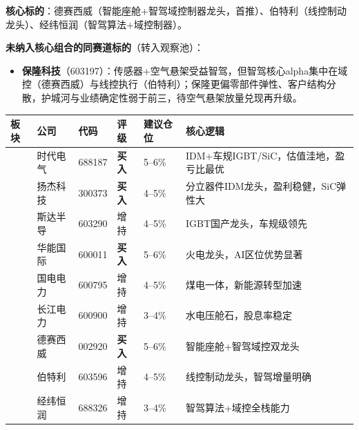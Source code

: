 \textbf{核心标的}：德赛西威（智能座舱+智驾域控制器龙头，首推）、伯特利（线控制动龙头）、经纬恒润（智驾算法+域控制器）。

\textbf{未纳入核心组合的同赛道标的}（转入观察池）：
\vspace{0.2em}
\begin{itemize}[leftmargin=2em]
\item \textbf{保隆科技}（603197）：传感器+空气悬架受益智驾，但智驾核心alpha集中在域控（德赛西威）与线控执行（伯特利）；保隆更偏零部件弹性、客户结构分散，护城河与业绩确定性弱于前三，待空气悬架放量兑现再升级。
\end{itemize}

\begin{exhibitbox}[表8-2：核心组合推荐标的一览]
\centering
\small
\setlength{\tabcolsep}{3pt}
\setlength{\aboverulesep}{0pt}
\setlength{\belowrulesep}{0pt}
\begin{tabularx}{\linewidth}{L{2.8cm} L{1.7cm} C{1.4cm} C{1.2cm} C{1.5cm} X}
\toprule
\textbf{板块} & \textbf{公司} & \textbf{代码} & \textbf{评级} & \textbf{建议仓位} & \textbf{核心逻辑} \\
\midrule
{}
& 时代电气 & 688187 & \textbf{买入} & 5--6\% & IDM+车规IGBT/SiC，估值洼地，盈亏比最优 \\
& 扬杰科技 & 300373 & \textbf{买入} & 4--5\% & 分立器件IDM龙头，盈利稳健，SiC弹性大 \\
 & 斯达半导 & 603290 & 增持 & 4--5\% & IGBT国产龙头，车规级领先 \\
\midrule
{}
& 华能国际 & 600011 & \textbf{买入} & 5--6\% & 火电龙头，AI区位优势显著 \\
& 国电电力 & 600795 & 增持 & 4--5\% & 煤电一体，新能源转型加速 \\
 & 长江电力 & 600900 & 增持 & 3--4\% & 水电压舱石，股息率稳定 \\
\midrule
{}
& 德赛西威 & 002920 & \textbf{买入} & 5--6\% & 智能座舱+智驾域控双龙头 \\
& 伯特利 & 603596 & 增持 & 4--5\% & 线控制动龙头，智驾增量明确 \\
 & 经纬恒润 & 688326 & 增持 & 3--4\% & 智驾算法+域控全栈能力 \\
\bottomrule
\end{tabularx}
\vspace{0.3em}
\end{exhibitbox}

